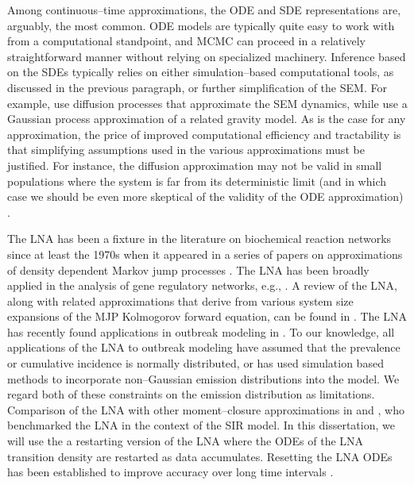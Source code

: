 Among continuous--time approximations, the ODE and SDE representations are, arguably, the most common. ODE models are typically quite easy to work with from a computational standpoint, and MCMC can proceed in a relatively straightforward manner without relying on specialized machinery. Inference based on the SDEs typically relies on either simulation--based computational tools, as discussed in the previous paragraph, or further simplification of the SEM. For example, \cite{cauchemez2004bayesian,cauchemez2008,roberts2001} use diffusion processes that approximate the SEM dynamics, while \cite{jandarov2014} use a Gaussian process approximation of a related gravity model. As is the case for any approximation, the price of improved computational efficiency and tractability is that simplifying assumptions used in the various approximations must be justified. For instance, the diffusion approximation may not be valid in small populations where the system is far from its deterministic limit (and in which case we should be even more skeptical of the validity of the ODE approximation) \cite{andersson2000stochastic}.

The LNA has been a fixture in the literature on biochemical reaction networks since at least the 1970s when it appeared in a series of papers on approximations of density dependent Markov jump processes \cite{kurtz1970solutions,kurtz1971limit}. The LNA has been broadly applied in the analysis of gene regulatory networks, e.g., \cite{finkenstadt2013quantifying,giagos2010inference,hey2015stochastic,komorowski2009,stathopoulos2013markov,thomas2012slow,zimmer2015deterministic}. A review of the LNA, along with related approximations that derive from various system size expansions of the MJP Kolmogorov forward equation, can be found in \cite{schnoerr2017approximation,wallace2012linear}. The LNA has recently found applications in outbreak modeling in \cite{black2010stochastic,fearnhead2014,golightly2015delayed,golightly2018bridge,ross2009parameter,ross2012parameter,rebuli2017hybrid,zimmer2017likelihood}. To our knowledge, all applications of the LNA to outbreak modeling have assumed that the prevalence or cumulative incidence is normally distributed, or has used simulation based methods to incorporate non--Gaussian emission distributions into the model. We regard both of these constraints on the emission distribution as limitations. Comparison of the LNA with other moment--closure approximations in \cite{grima2012study} and \cite{buckingham2018gaussian}, who benchmarked the LNA in the context of the SIR model. In this dissertation, we will use the a restarting version of the LNA where the ODEs of the LNA transition density are restarted as data accumulates. Resetting the LNA ODEs has been established to improve accuracy over long time intervals \cite{fearnhead2014,folia2017trajectory,giagos2010inference}.

